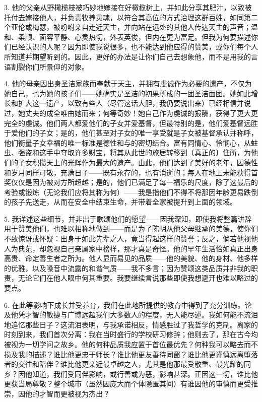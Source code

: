 3. 他的父亲从野橄榄枝被巧妙地嫁接在好橄榄树上，并如此分享其肥汁，以致被托付去嫁接他人，并负责牧养灵魂，以符合其高位的方式治理这群百姓，如同第二个亚伦或梅瑟，被吩咐亲自走近天主，并向站在远处的其他人传达天主的声音；温和、柔顺、面容平静、心灵热切，外表英俊，但内在更为富足。但我为何要描述你们已经认识的人呢？因为即使我说很多，也不能达到他应得的赞美，或你们每个人所知道并期望听到的。因此，更好的办法是让你们自己去想象他，而不是用我的言语割裂你们所景仰的对象。\par

4. 他的母亲因出身圣洁家族而奉献于天主，并拥有虔诚作为必要的遗产，不仅为她自己，也为她的孩子们——她确实是圣洁的初果所成的一团圣洁面团。她如此增长和扩大这一遗产，以致有些人（尽管这话大胆，我仍要说出来）已经相信并说过，她丈夫的成全唯由她而来；何等奇妙！她自己作为虔诚的报酬，获得了更大更完全的虔诚。他们两人都爱他们的子女并爱基督，但最特别的是，他们爱基督远胜于爱他们的子女；是的，他们甚至对子女的唯一享受就是子女被基督承认并称呼，他们衡量子女幸福的唯一标准是德性和与的密切结合。富有同情心、怜悯心，从蛀虫、强盗和这手中夺取许多财宝，将其从此世的旅居转移到〔真正的〕住所，为他们的子女积攒天上的光辉作为最大的遗产。由此，他们达到了美好的老年，因德性和岁月同样可敬，充满日子——既有永存的，也有消逝的；每人在地上未能获得首奖仅仅是因为被对方所超越；是的，他们已满足了每一福乐的尺度，除了这最后的考验或锻炼（无论我们应将其称为何）——我是指他们不得不将那因年龄更易跌倒的孩子先送走，从而在安全中结束生命，并带着全家被提升到上面的领域。\par

5. 我详述这些细节，并非出于歌颂他们的愿望——因我深知，即使我将整篇讲辞用于赞美他们，也难以相称地做到——而是为了陈明从他父母继承的美德，使你们不致惊讶或怀疑：出身于如此先辈之人，竟当得起这样的赞誉；反之，倘若他视他人为典范，却忽视自己亲属家中榜样，那才真是奇怪。他的早年生活恰如真正出身高贵、命定善生者之所为。他人显而易见的品质——他的美貌、他的身材、他多样的优雅，以及嗓音中流露的和谐气质——我不多言；因为赞颂这类品质并非我的职责，无论它们在他人眼中何其重要。我要继续言说那些即使我想避开也难以略过的要点。\par

6. 在此等影响下成长并受养育，我们在此地所提供的教育中得到了充分训练。论及他凭才智的敏捷与广博远超我们大多数人的程度，无人能尽述。我如何能不流泪地追忆那些日子？这流泪表明，与我承诺相反，情感胜过了我哲学的克制。离家的时刻到来，我们首次分离：我在当时盛行的学校研习修辞；他则去了，那在古今均被视为一切学问之故乡。他的何种品质我应置于首位最优先？何种我可以略去而不损及我的描述？谁比他更忠于师长？谁比他更友善待同窗？谁比他更谨慎远离堕落者的交往和陪伴？谁比他更亲近最卓越之人，尤其是他那最受敬重、最光耀的同乡？因他知道，我们受同伴影响，或行善或为恶，影响甚深。正因这一切，谁比他更获当局尊敬？整个城市（虽然因庞大而个体隐匿其间）有谁因他的审慎而更受推崇，因他的才智而更被视为杰出？\par

